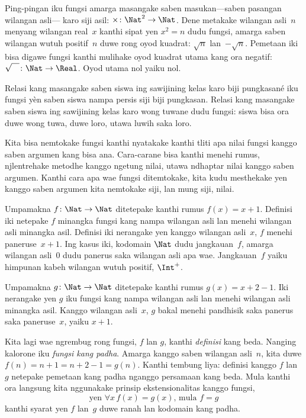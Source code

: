 \documentclass[../../../include/open-logic-section]{subfiles}
\begin{document}
\begin{ex}
Ping-pingan iku fungsi amarga masangake saben
masukan---saben pasangan wilangan asli---
karo siji asil: $\times \colon \Nat^2 \to\Nat$.
Dene metakake wilangan asli~$n$
menyang wilangan real~$x$ kanthi sipat yen
$x^2 = n$ dudu fungsi, amarga saben
wilangan wutuh positif~$n$ duwe rong
oyod kuadrat: $\sqrt{n}$ lan~$-\sqrt{n}$.
Pemetaan iki bisa digawe fungsi kanthi
mulihake oyod kuadrat utama kang ora negatif:
$\sqrt{\phantom{X}} \colon\Nat \to \Real$.
Oyod utama nol yaiku nol.
\end{ex}

\begin{ex}
Relasi kang masangake saben siswa ing sawijining
kelas karo biji pungkasané iku fungsi yèn
saben siswa nampa persis siji biji pungkasan.
Relasi kang masangake saben siswa ing sawijining
kelas karo wong tuwane dudu fungsi:
siswa bisa ora duwe wong tuwa, duwe loro,
utawa luwih saka loro.
\end{ex}

\begin{explain}
Kita bisa nemtokake fungsi kanthi nyatakake
kanthi tliti apa nilai fungsi kanggo saben
argumen kang bisa ana. Cara-carane bisa
kanthi menehi rumus, njlentrehake metodhe
kanggo ngetung nilai, utawa ndhaptar
nilai kanggo saben argumen.
Kanthi cara apa wae fungsi ditemtokake,
kita kudu mesthekake yen kanggo saben
argumen kita nemtokake siji, lan mung siji, nilai.
\end{explain}


\begin{ex}
Umpamakna $f \colon \Nat \to \Nat$
ditetepake kanthi rumus $f(x) = x+1$.
Definisi iki netepake $f$ minangka fungsi
kang nampa wilangan asli lan menehi
wilangan asli minangka asil.
Definisi iki nerangake yen kanggo wilangan
asli~$x$, $f$ menehi paneruse~$x+1$.
Ing kasus iki, kodomain $\Nat$ dudu
jangkauan~$f$, amarga wilangan asli~$0$
dudu panerus saka wilangan asli apa wae.
Jangkauan~$f$ yaiku himpunan kabeh
wilangan wutuh positif, $\Int^{+}$.
\end{ex}

\begin{ex}
Umpamakna $g \colon \Nat \to \Nat$
ditetepake kanthi rumus $g(x) = x+2-1$.
Iki nerangake yen $g$ iku fungsi kang
nampa wilangan asli lan menehi
wilangan asli minangka asil.
Kanggo wilangan asli~$x$, $g$ bakal
menehi pandhisik saka panerus saka
paneruse~$x$, yaiku $x+1$.
\end{ex}

\begin{explain}
Kita lagi wae ngrembug rong fungsi,
$f$ lan $g$, kanthi \emph{definisi}
kang beda. Nanging kalorone iku
\emph{fungsi kang padha}.
Amarga kanggo saben wilangan asli~$n$,
kita duwe $f(n) = n+1 = n+2-1 =g(n)$.
Kanthi tembung liya: definisi kanggo $f$
lan~$g$ netepake pemetaan kang padha
nganggo persamaan kang beda.
Mula kanthi ora langsung kita nggunakake
prinsip ekstensionalitas kanggo fungsi,
\[
  \text{yen }\forall x\, f(x) = g(x)\text{, mula }f = g
\]
kanthi syarat yen $f$ lan~$g$ duwe ranah lan
kodomain kang padha.
\end{explain}
\end{document}
